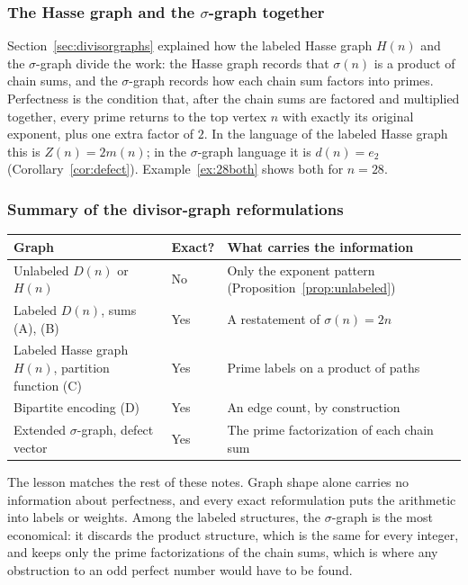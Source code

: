 \documentclass[11pt]{article}
\theoremstyle{definition}
\theoremstyle{remark}
\begin{document}
\subsubsection{The Hasse graph and the $\sigma$-graph together}

Section~\ref{sec:divisorgraphs} explained how the labeled Hasse graph $H(n)$
and the $\sigma$-graph divide the work: the Hasse graph records that $\sigma(n)$ is a
product of chain sums, and the $\sigma$-graph records how each chain sum
factors into primes.  Perfectness is the condition that, after the chain sums
are factored and multiplied together, every prime returns to the top vertex
$n$ with exactly its original exponent, plus one extra factor of $2$.  In the
language of the labeled Hasse graph this is $Z(n)=2m(n)$; in the
$\sigma$-graph language it is $d(n)=e_2$ (Corollary~\ref{cor:defect}).
Example~\ref{ex:28both} shows both for $n=28$.

\subsubsection{Summary of the divisor-graph reformulations}

\begin{center}
\begin{tabular}{@{}p{}p{}p{}@{}}
\toprule
\textbf{Graph} & \textbf{Exact?} & \textbf{What carries the information}\\
\midrule
Unlabeled $D(n)$ or $H(n)$ & No & Only the exponent pattern
(Proposition~\ref{prop:unlabeled})\\
Labeled $D(n)$, sums (A), (B) & Yes & A restatement of $\sigma(n)=2n$\\
Labeled Hasse graph $H(n)$, partition function (C) & Yes & Prime labels on a
product of paths\\
Bipartite encoding (D) & Yes & An edge count, by construction\\
Extended $\sigma$-graph, defect vector & Yes & The prime factorization of
each chain sum\\
\bottomrule
\end{tabular}
\end{center}

The lesson matches the rest of these notes.  Graph shape alone carries no
information about perfectness, and every exact reformulation puts the
arithmetic into labels or weights.  Among the labeled structures, the
$\sigma$-graph is the most economical: it discards the product structure,
which is the same for every integer, and keeps only the prime factorizations
of the chain sums, which is where any obstruction to an odd perfect number
would have to be found.
\end{document}

